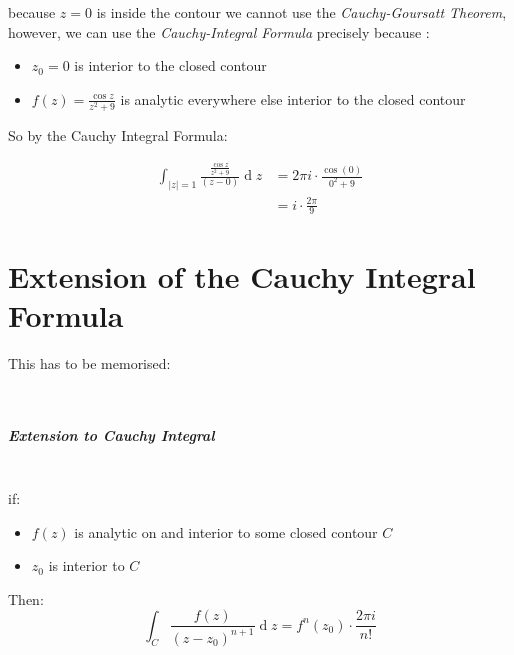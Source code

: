 \documentclass[class=article, crop=false]{standalone}
\begin{document}
because $z = 0$ is inside the contour we cannot use the \textit{Cauchy-Goursatt Theorem}, however, we can use the \textit{Cauchy-Integral Formula} precisely because :
\begin{itemize}
  \item $z_0 = 0$ is interior to the closed contour
  \item $f\left( z \right) = \frac{\cos{z}}{z^2+ 9} $ is analytic everywhere else interior to the closed contour
\end{itemize}

So by the Cauchy Integral Formula:

\begin{align*}
    \int^{}_{    \left| z \right| = 1} \frac{\frac{\cos{z}}{z^2+ 9}}{\left( z- 0 \right) }  \operatorname{d}z &= 2\pi i \cdot \frac{\cos{\left( 0 \right) }}{0^2+ 9} \\
    &= i\cdot \frac{2\pi}{9}
\end{align*}

\section{Extension of the Cauchy Integral Formula}
This has to be memorised:

 \ \

\hfill\begin{minipage}{\dimexpr\textwidth-3cm}
\begin{tcolorbox}
  \subparagraph{Extension to Cauchy Integral}\ \\

if:
\begin{itemize}
  \item $f\left( z \right) $ is analytic on and interior to some closed contour $C$ 
  \item $z_0$ is interior to $C$ 
\end{itemize}

Then:
\[
  \int^{}_{C} \frac{f\left( z \right) }{\left( z- z_0 \right) ^{n+ 1}}  \operatorname{d}z = f^{n}\left( z_0 \right) \cdot \frac{2\pi i}{n!} 
\]
\end{tcolorbox}

\end{minipage}
\ \
\end{document}
